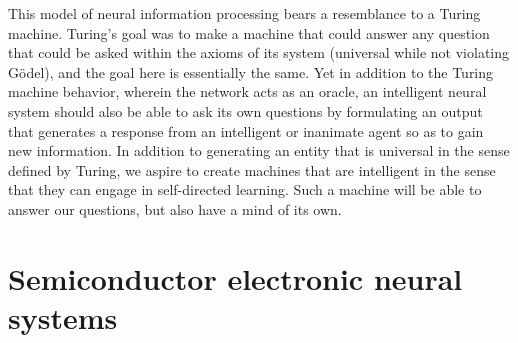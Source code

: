 \documentclass[twocolumn]{article}
\begin{document}
This model of neural information processing bears a resemblance to a Turing machine. Turing's goal was to make a machine that could answer any question that could be asked within the axioms of its system (universal while not violating G\"{o}del), and the goal here is essentially the same. Yet in addition to the Turing machine behavior, wherein the network acts as an oracle, an intelligent neural system should also be able to ask its own questions by formulating an output that generates a response from an intelligent or inanimate agent so as to gain new information. In addition to generating an entity that is universal in the sense defined by Turing, we aspire to create machines that are intelligent in the sense that they can engage in self-directed learning. Such a machine will be able to answer our questions, but also have a mind of its own.

\section{\label{sec:electronics}Semiconductor electronic neural systems}
\end{document}
